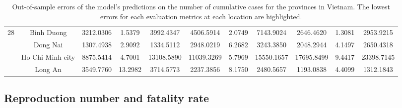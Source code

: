 \begin{landscape}
\begin{table}[!htb]
\begin{tabular}{| c | c | c | c | c | c | c | c | c | c | c |}
        \multirow{4}{*}{28}
            & Binh Duong & 3212.0306 & 1.5379 & 3992.4347 & 4506.5914 & 2.0749 & 7143.9024 & 2646.4620 & 1.3081 & 2953.9215
            \\ \cline{2-11}
            & Dong Nai & 1307.4938 & 2.9092 & 1334.5112 & 2948.0219 & 6.2682 & 3243.3850 & 2048.2944 & 4.1497 & 2650.4318
            \\ \cline{2-11}
            & Ho Chi Minh city & 8875.5414 & 4.7001 & 13108.5890 & 11039.3269 & 5.7969 & 15550.1657 & 17695.8499 & 9.4417 & 23398.7145
            \\ \cline{2-11}
            & Long An & 3549.7760 & 13.2982 & 3714.5773 & 2237.3856 & 8.1750 & 2480.5657 & 1193.0838 & 4.4099 & 1312.1843
            \\
        \hline
    \end{tabular}
    \caption{Out-of-sample errors of the model's predictions on the number of cumulative cases for the provinces in Vietnam. The lowest errors for each evaluation metrics at each location are highlighted.}
\end{table}
\end{landscape}

\subsection{Reproduction number and fatality rate}

